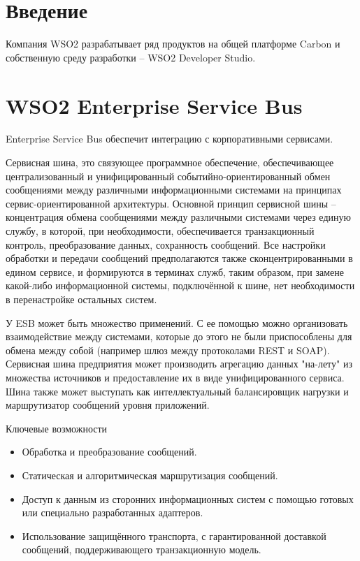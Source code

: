 \documentclass[a4paper, 12pt]{article}		%
\begin{document}


\tableofcontents{}
\newpage

\section*{Введение}

Компания WSO2 разрабатывает ряд продуктов на общей платформе Carbon и собственную среду разработки -- WSO2 Developer Studio.

\section{WSO2 Enterprise Service Bus}

Enterprise Service Bus обеспечит интеграцию с корпоративными сервисами.

Сервисная шина, это связующее программное обеспечение, обеспечивающее централизованный и унифицированный событийно-ориентированный обмен сообщениями между различными информационными системами на принципах сервис-ориентированной архитектуры. Основной принцип сервисной шины -- концентрация обмена сообщениями между различными системами через единую службу, в которой, при необходимости, обеспечивается транзакционный контроль, преобразование данных, сохранность сообщений. Все настройки обработки и передачи сообщений предполагаются также сконцентрированными в едином сервисе, и формируются в терминах служб, таким образом, при замене какой-либо информационной системы, подключённой к шине, нет необходимости в перенастройке остальных систем.

У ESB может быть множество применений. С ее помощью можно организовать взаимодействие между системами, которые до этого не были приспособлены для обмена между собой (например шлюз между протоколами REST и SOAP). Сервисная шина предприятия может производить агрегацию данных "на-лету" из множества источников и предоставление их в виде унифицированного сервиса. Шина также может выступать как интеллектуальный балансировщик нагрузки и маршрутизатор сообщений уровня приложений.

Ключевые возможности
\begin{itemize}
\item Обработка и преобразование сообщений.
\item Статическая и алгоритмическая маршрутизация сообщений.
\item Доступ к данным из сторонних информационных систем с помощью готовых или специально разработанных адаптеров.
\item Использование защищённого транспорта, с гарантированной доставкой сообщений, поддерживающего транзакционную модель.
\end{itemize}
\end{document}
